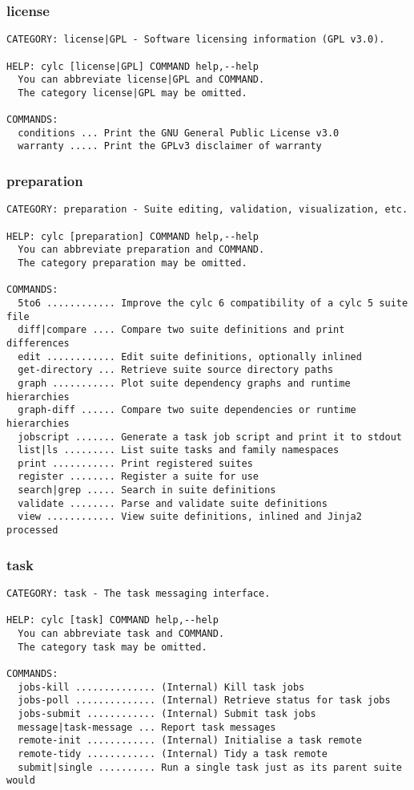 \subsubsection{license}
\label{license}
\begin{lstlisting}
CATEGORY: license|GPL - Software licensing information (GPL v3.0).

HELP: cylc [license|GPL] COMMAND help,--help
  You can abbreviate license|GPL and COMMAND.
  The category license|GPL may be omitted.

COMMANDS:
  conditions ... Print the GNU General Public License v3.0
  warranty ..... Print the GPLv3 disclaimer of warranty
\end{lstlisting}
\subsubsection{preparation}
\label{preparation}
\begin{lstlisting}
CATEGORY: preparation - Suite editing, validation, visualization, etc.

HELP: cylc [preparation] COMMAND help,--help
  You can abbreviate preparation and COMMAND.
  The category preparation may be omitted.

COMMANDS:
  5to6 ............ Improve the cylc 6 compatibility of a cylc 5 suite file
  diff|compare .... Compare two suite definitions and print differences
  edit ............ Edit suite definitions, optionally inlined
  get-directory ... Retrieve suite source directory paths
  graph ........... Plot suite dependency graphs and runtime hierarchies
  graph-diff ...... Compare two suite dependencies or runtime hierarchies
  jobscript ....... Generate a task job script and print it to stdout
  list|ls ......... List suite tasks and family namespaces
  print ........... Print registered suites
  register ........ Register a suite for use
  search|grep ..... Search in suite definitions
  validate ........ Parse and validate suite definitions
  view ............ View suite definitions, inlined and Jinja2 processed
\end{lstlisting}
\subsubsection{task}
\label{task}
\begin{lstlisting}
CATEGORY: task - The task messaging interface.

HELP: cylc [task] COMMAND help,--help
  You can abbreviate task and COMMAND.
  The category task may be omitted.

COMMANDS:
  jobs-kill .............. (Internal) Kill task jobs
  jobs-poll .............. (Internal) Retrieve status for task jobs
  jobs-submit ............ (Internal) Submit task jobs
  message|task-message ... Report task messages
  remote-init ............ (Internal) Initialise a task remote
  remote-tidy ............ (Internal) Tidy a task remote
  submit|single .......... Run a single task just as its parent suite would
\end{lstlisting}
